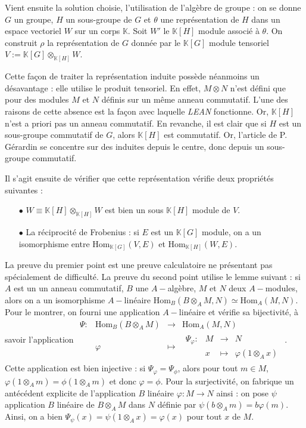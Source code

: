 \documentclass[10pt]{article}
\newcommand{\fonction}[5]{\begin{array}{l|rcl}
		#1: & #2 & \longrightarrow & #3 \\
		& #4 & \longmapsto & #5 \end{array}}
\theoremstyle{definition}
\begin{document}
Vient ensuite la solution choisie, l'utilisation de l'algèbre de groupe : on se donne $G$ un groupe, $H$ un sous-groupe de $G$ et $\theta$ une représentation de $H$ dans un espace vectoriel $W$ sur un corps $\mathbb{K}$. Soit $W'$ le $\mathbb{K}[H]$ module associé à $\theta$. On construit $\rho$ la représentation de $G$ donnée par le $\mathbb{K}[G]$ module tensoriel $V:=\mathbb{K}[G]\otimes_{\mathbb{K}[H]}W$.
\newline 

Cette façon de traiter la représentation induite possède néanmoins un désavantage : elle utilise le produit tensoriel. En effet, $M\otimes N$ n'est défini que pour des modules $M$ et $N$ définis sur un même anneau commutatif. L'une des raisons de cette absence est la façon avec laquelle \textit{LEAN} fonctionne. 
\newline
Or, $\mathbb{K}[H]$ n'est a priori pas un anneau commutatif. En revanche, il est clair que si $H$ est un sous-groupe commutatif de $G$, alors $\mathbb{K}[H]$ est commutatif. Or, l'article de P. Gérardin se concentre sur des induites depuis le centre, donc depuis un sous-groupe commutatif. 
\newline

 Il s'agit ensuite de vérifier que cette représentation vérifie deux propriétés suivantes : 
 \begin{itemize}
 	\item [$\bullet$] $W\equiv\mathbb{K}[H]\otimes_{\mathbb{K}[H]}W$ est bien un sous $\mathbb{K}[H]$ module de $V$.
 	\item[$\bullet$] La réciprocité de Frobenius : si $E$ est un $\mathbb{K}[G]$ module, on a un isomorphisme entre $\text{Hom}_{\mathbb{K}[G]}(V,E)$ et $\text{Hom}_{\mathbb{K}[H]}(W,E)$.
 \end{itemize}

La preuve du premier point est une preuve calculatoire ne présentant pas spécialement de difficulté.
La preuve du second point utilise le lemme suivant : si $A$ est un un anneau commutatif, $B$ une $A-$algèbre, $M$ et $N$ deux $A-$modules, alors on a un isomorphisme $A-$linéaire $\text{Hom}_B(B\otimes_AM,N)\simeq \text{Hom}_A(M,N)$. Pour le montrer, on fourni une application $A-$linéaire et vérifie sa bijectivité, à savoir l'application $\fonction{\Psi}{\text{Hom}_B(B\otimes_AM)}{\text{Hom}_A(M,N)}{\varphi}{\fonction{\Psi_\varphi}{M}{N}{x}{\varphi(1\otimes_A x)}}$. Cette application est bien injective : si $\Psi_\varphi=\Psi_\phi$, alors pour tout $m\in M$, $\varphi(1\otimes_A m)=\phi(1\otimes_Am)$ et donc $\varphi=\phi$. Pour la surjectivité, on fabrique un antécédent explicite de l'application $B$ linéaire $\varphi:M\rightarrow N$ ainsi : on pose $\psi$ application $B$ linéaire de $B\otimes_A M$ dans $N$ définie par $\psi(b\otimes_Am)=b\varphi(m)$. Ainsi, on a bien $\Psi_\psi(x)=\psi(1\otimes_Ax)=\varphi(x)$ pour tout $x$ de $M$.
\newline
\end{document}
